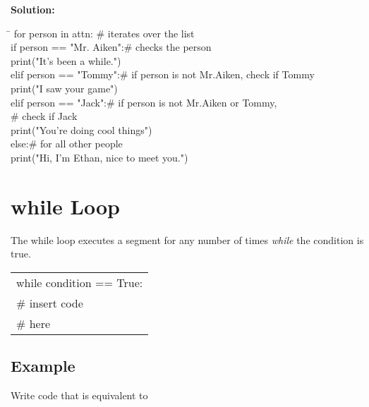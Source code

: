 \documentclass{article}
\newcommand{\icode}[1]{{\ttfamily #1}}
\newenvironment{code}{\begin{tcolorbox}\ttfamily}{\end{tcolorbox}}
\begin{document}
\noindent \textbf{Solution:}

\begin{code}
	\begin{tabbing}
		\hspace{8 cm} \= \hspace{3 cm} \kill 
		for person in attn: \>\# iterates over the list\\
		\hspace{2 em}if person == "Mr. Aiken":\>\# checks the person\\
		\hspace{4 em}print("It's been a while.")\\
		\hspace{2 em}elif person == "Tommy":\>\# if person is not Mr.Aiken, check if Tommy\\
		\hspace{4 em}print("I saw your game")\\
		\hspace{2 em}elif person == "Jack":\>\# if person is not Mr.Aiken or Tommy,\\ \>\# check if Jack\\
		\hspace{4 em}print("You're doing cool things")\\
		\hspace{2 em}else:\>\# for all other people\\
		\hspace{4 em}print("Hi, I'm Ethan, nice to meet you.")
	\end{tabbing}
\end{code}

\section{\icode{while} Loop}
The \icode{while} loop executes a segment for any number of times \textit{while} the condition is true. 

\begin{center} \ttfamily
	\begin{tabular}{|l}
		while condition == True:\\
		\hspace{2 em}\# insert code\\
		\hspace{2 em}\# here
	\end{tabular}
\end{center}


\subsection{Example}
\noindent Write code that is equivalent to 
\end{document}
